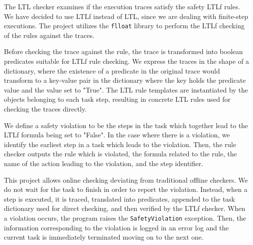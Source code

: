 The LTL checker examines if the execution traces satisfy the safety LTLf rules. We have decided to use LTLf instead of LTL, since we are dealing
with finite-step executions. The project utilizes the \texttt{flloat} library to perform the LTLf checking of the rules against the traces.

Before checking the trace against the rule, the trace is transformed into boolean predicates suitable for LTLf rule checking. We express
the traces in the shape of a dictionary, where the existence of a predicate in the original trace would transform to a key-value pair in the
dictionary where the key holds the predicate value and the value set to "True". The LTL rule templates are instantiated by the objects 
belonging to each task step, resulting in concrete LTL rules used for checking the traces directly.

We define a safety violation to be the steps in the task which together lead to the LTLf formula being set to "False". In the case
where there is a violation, we identify the earliest step in a task which leads to the violation. Then, the rule checker outputs the 
rule which is violated, the formula related to the rule, the name of the action leading to the violation, and the step identifier.

This project allows online checking deviating from traditional offline checkers. We do not wait for the task to finish in order to
report the violation. Instead, when a step is executed, it is traced, translated into predicates, appended to the task dictionary used for direct checking,
and then verified by the LTLf checker. When a violation occurs, the program raises the \texttt{SafetyViolation} exception. Then, the information
corresponding to the violation is logged in an error log and the current task is immediately terminated moving on to the next one.